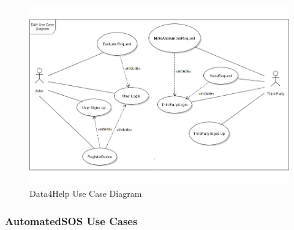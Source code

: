 \begin{figure}[H]
	\centering\setlength{\captionmargin}{0pt}%
	\includegraphics[scale=0.5]{Images/UML/D4H_usecase.png}
	\vspace*{-10mm}\caption{Data4Help Use Case Diagram}
	\label{figure11}
\end{figure}
\newpage
{\color{Blue}\subsubsection{AutomatedSOS Use Cases}}

